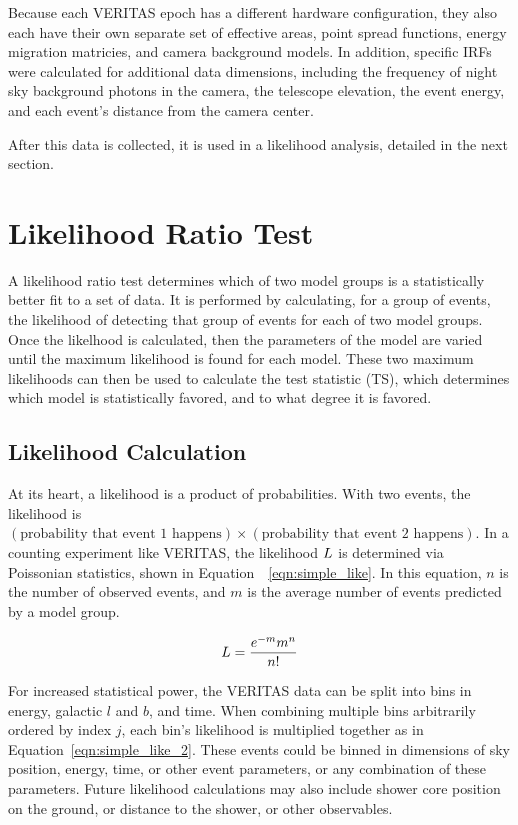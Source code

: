   Because each VERITAS epoch has a different hardware configuration, they also each have their own separate set of effective areas, point spread functions, energy migration matricies, and camera background models.
  In addition, specific IRFs were calculated for additional data dimensions, including the frequency of night sky background photons in the camera, the telescope elevation, the event energy, and each event's distance from the camera center.
  
  After this data is collected, it is used in a likelihood analysis, detailed in the next section.

\section{Likelihood Ratio Test}\label{sec:likeratio}
  A likelihood ratio test determines which of two model groups is a statistically better fit to a set of data.
  It is performed by calculating, for a group of events, the likelihood of detecting that group of events for each of two model groups.
  Once the likelhood is calculated, then the parameters of the model are varied until the maximum likelihood is found for each model.
  These two maximum likelihoods can then be used to calculate the test statistic (TS), which determines which model is statistically favored, and to what degree it is favored.
  
  \subsection{Likelihood Calculation}
  At its heart, a likelihood is a product of probabilities.
  With two events, the likelihood is $(\textrm{probability that event 1 happens})\times(\textrm{probability that event 2 happens})$.
  In a counting experiment like VERITAS, the likelihood $L$ is determined via Poissonian statistics, shown in Equation~~\ref{eqn:simple_like}.
  In this equation, $n$ is the number of observed events, and $m$ is the average number of events predicted by a model group.
  
  \begin{equation}\label{eqn:simple_like}
    L = \frac{e^{-m} m^n}{n!}
  \end{equation}
  
  For increased statistical power, the VERITAS data can be split into bins in energy, galactic $l$ and $b$, and time.
  When combining multiple bins arbitrarily ordered by index $j$, each bin's likelihood is multiplied together as in Equation~\ref{eqn:simple_like_2}.
  These events could be binned in dimensions of sky position, energy, time, or other event parameters, or any combination of these parameters.
  Future likelihood calculations may also include shower core position on the ground, or distance to the shower, or other observables.
  
